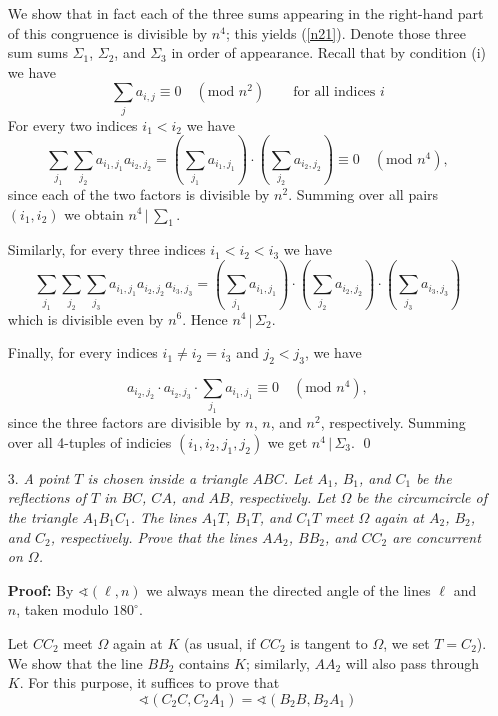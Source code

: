 \documentclass[a4paper, 12pt]{article}
\begin{document}
\begin{enumerate}
We show that in fact each of the three sums appearing in the right-hand part of this congruence is divisible by $n^4$; this yields (\ref{n21}). Denote those three sum sums $\Sigma_1$, $\Sigma_2$, and $\Sigma_3$ in order of appearance. Recall that by condition (i) we have
$$
\sum_j a_{i, j} \equiv 0 \quad (\textrm{mod } n^2) \qquad \textrm{for all indices } i
$$
For every two indices $i_1 < i_2$ we have
$$
\sum_{j_1} \sum_{j_2} a_{i_1, j_1}  a_{i_2, j_2} = \left( \sum_{j_1} a_{i_1, j_1}  \right) \cdot \left( \sum_{j_2} a_{i_2, j_2}  \right) \equiv 0 \quad (\textrm{mod } n^4 ),
$$
since each of the two factors is divisible by $n^2$. Summing over all pairs $(i_1, i_2)$ we obtain $n^4 \,|\, \sum_1$.

Similarly, for every three indices $i_1 < i_2 < i_3$ we have
$$
\sum_{j_1} \sum_{j_2} \sum_{j_3} a_{i_1, j_1} a_{i_2, j_2} a_{i_3, j_3} = \left( \sum_{j_1} a_{i_1, j_1}  \right) \cdot \left( \sum_{j_2} a_{i_2, j_2}  \right) \cdot \left( \sum_{j_3} a_{i_3, j_3}  \right)
$$
which is divisible even by $n^6$. Hence $n^4 \,|\, \Sigma_2$.

Finally, for every indices $i_1 \not = i_2 = i_3$ and $j_2 < j_3$, we have

$$
a_{i_2, j_2} \cdot a_{i_2, j_3} \cdot \sum_{j_1} a_{i_1, j_1} \equiv 0 \quad (\textrm{mod } n^4),
$$
since the three factors are divisible by $n$, $n$, and $n^2$, respectively. Summing over all 4-tuples of indicies $(i_1, i_2, j_1, j_2)$ we get $n^4 \,|\, \Sigma_3$. \qed

\vspace{5mm}
\item[3.]  \textit{A point $T$ is chosen inside a triangle $ABC$. Let $A_1$, $B_1$, and $C_1$ be the reflections of $T$ in $BC$, $CA$, and $AB$, respectively. Let $\Omega$ be the circumcircle of the triangle $A_1 B_1 C_1$. The lines $A_1 T$, $B_1 T$, and $C_1 T$ meet $\Omega$ again at $A_2$, $B_2$, and $C_2$, respectively. Prove that the lines $AA_2$, $BB_2$, and $CC_2$ are concurrent on $\Omega$.}
 \vspace{5mm}

\textbf{Proof: } By $\sphericalangle (\ell, n)$ we always mean the directed angle of the lines $\ell$ and $n$, taken modulo $180^\circ$.

Let $CC_2$ meet $\Omega$ again at $K$ (as usual, if $CC_2$ is tangent to $\Omega$, we set $T = C_2$). We show that the line $BB_2$ contains $K$; similarly, $AA_2$ will also pass through $K$. For this purpose, it suffices to prove that
\begin{equation} \label{g41}
    \sphericalangle (C_2C, C_2A_1) = \sphericalangle (B_2 B, B_2A_1)
\end{equation}


\end{enumerate}
\end{document}
